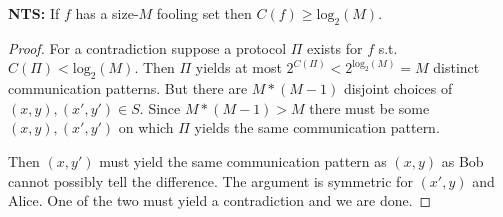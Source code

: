 \textbf{NTS:} If $f$ has a size-$M$ fooling set then $C(f) \geq \text{log}_2(M)$.
\begin{proof}
For a contradiction suppose a protocol $\Pi$ exists for $f$ s.t. $C(\Pi) < \text{log}_2(M)$.
\pause
Then $\Pi$ yields at most $2^{C(\Pi)} < 2^{\text{log}_2(M)} = M$
distinct communication patterns.
\pause
But there are $M * (M - 1)$ disjoint choices of $(x, y), (x', y') \in S$.
\pause
Since $M * (M - 1) > M$ there must be some $(x, y), (x', y')$ on which $\Pi$ yields the same communication pattern.

\medskip

\pause
Then $(x, y')$ must yield the same communication pattern as $(x, y)$
as Bob cannot possibly tell the difference.  The argument is symmetric for $(x', y)$ and Alice.  One of the two must yield a contradiction and we are done.
\end{proof}